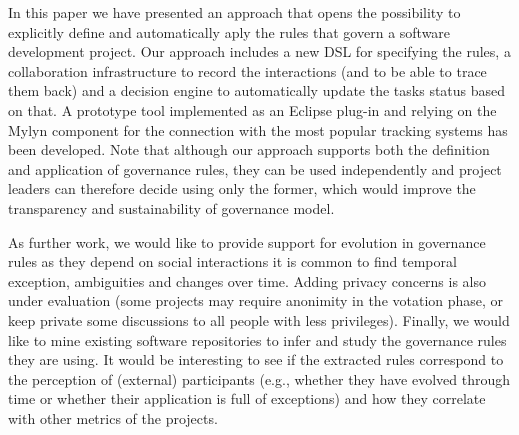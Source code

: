 In this paper we have presented an approach that opens the possibility to explicitly define and automatically aply the rules that govern a software development project. Our approach includes a new DSL for specifying the rules, a collaboration infrastructure to record the interactions (and to be able to trace them back) and a decision engine to automatically update the tasks status based on that. A prototype tool implemented as an Eclipse plug-in and relying on the Mylyn component for the connection with the most popular tracking systems has been developed. Note that although our approach supports both the definition and application of governance rules, they can be used independently and project leaders can therefore decide using only the former, which would improve the transparency and sustainability of governance model.


As further work, we would like to provide support for evolution in governance rules as they depend on social interactions it is common to find temporal exception, ambiguities and changes over time.
Adding privacy concerns is also under evaluation (some projects may require anonimity in the votation phase, or keep private some discussions to all people with less privileges). Finally, we would like to mine existing software repositories to infer and study the governance rules they are using. It would be interesting to see if the extracted rules correspond to the perception of (external) participants (e.g., whether they have evolved through time or whether their application is full of exceptions) and how they correlate with other metrics of the projects.
